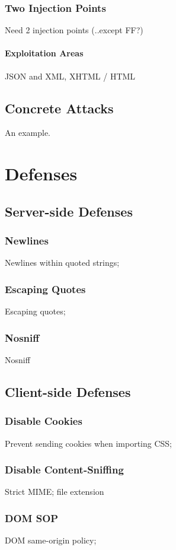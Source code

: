 \documentclass{acm_proc_article-sp}
\begin{document}
\subsubsection{Two Injection Points}
Need 2 injection points (..except FF?)

\paragraph{Exploitation Areas}
JSON and XML,  XHTML / HTML

\subsection{Concrete Attacks}
An example.

\section{Defenses}

\subsection{Server-side Defenses}
\subsubsection{Newlines}
Newlines within quoted strings;
\subsubsection{Escaping Quotes}
Escaping quotes;
\subsubsection{Nosniff}
Nosniff

\subsection{Client-side Defenses}
\subsubsection{Disable Cookies}
Prevent sending cookies when importing CSS;
\subsubsection{Disable Content-Sniffing}
Strict MIME; file extension
\subsubsection{DOM SOP}
DOM same-origin policy;
\end{document}
